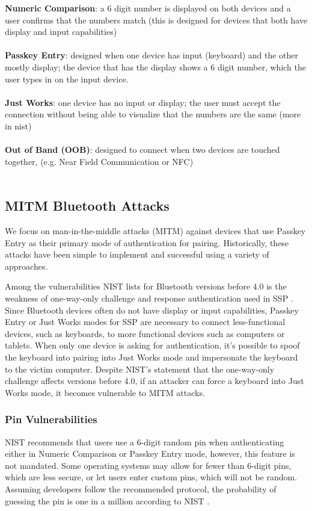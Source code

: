 \documentclass{acm_proc_article-sp}
\begin{document}
\textbf{Numeric Comparison}: a 6 digit number is displayed on both devices and a user confirms that the numbers match (this is designed for devices that both have display and input capabilities)\\\\
\textbf{Passkey Entry}: designed when one device has input (keyboard) and the other mostly display; the device that has the display shows a 6 digit number, which the user types in on the input device.\\\\
\textbf{Just Works}: one device has no input or display; the user must accept the connection without being able to visualize that the numbers are the same (more in nist)\\\\
\textbf{Out of Band (OOB)}: designed to connect when two devices are touched together, (e.g. Near Field Communication or NFC)\\\\

\subsection{MITM Bluetooth Attacks}
We focus on man-in-the-middle attacks (MITM) against devices that use Passkey Entry as their primary mode of authentication for pairing. Historically, these attacks have been simple to implement and successful using a variety of approaches.  

Among the vulnerabilities NIST lists for Bluetooth versions before 4.0 is the weakness of one-way-only challenge and response authentication used in SSP \cite{scarfone2008guide}. 
Since Bluetooth devices often do not have display or input capabilities, Passkey Entry or Just Works modes for SSP are necessary to connect less-functional devices, such as keyboards, to more functional devices such as computers or tablets. When only one device is asking for authentication, it's possible to spoof the keyboard into pairing into Just Works mode and impersonate the keyboard to the victim computer. Despite NIST's statement that the one-way-only challenge affects versions before 4.0, if an attacker can force a keyboard into Just Works mode, it becomes vulnerable to MITM attacks.

\subsubsection{Pin Vulnerabilities}
NIST recommends that users use a 6-digit random pin when authenticating either in Numeric Comparison or Passkey Entry mode, however, this feature is not mandated. Some operating systems may allow for fewer than 6-digit pins, which are less secure, or let users enter custom pins, which will not be random. Assuming developers follow the recommended protocol, the probability of guessing the pin is one in a million according to NIST \cite{scarfone2008guide}. 
\end{document}
